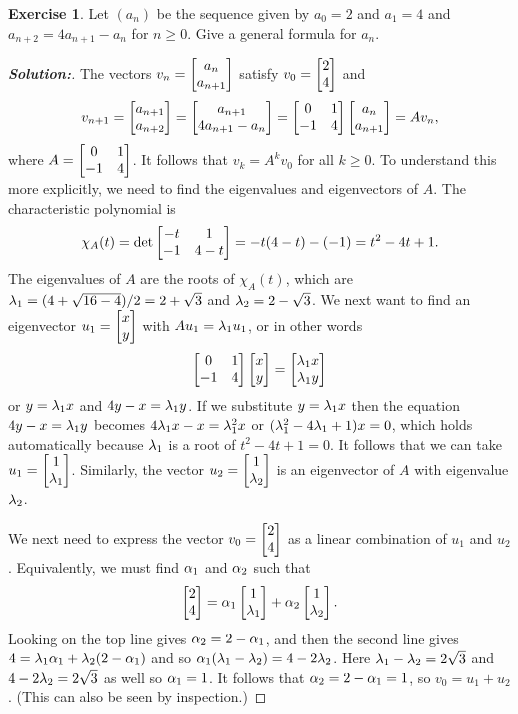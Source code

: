 \documentclass[a4paper]{amsart}
\theoremstyle{definition}
\newtheorem{exercise}{Exercise}
\newenvironment{solution}{\begin{proof}[\textbf{Solution:}] \vphantom{u}}{\end{proof}}
\begin{document}
\begin{exercise}\label{ex-diffeq-iii}
 Let $(a_n)$ be the sequence given by $a_0=2$ and $a_1=4$ and
 $a_{n+2}=4a_{n+1}-a_n$ for $n\geq 0$.  Give a general formula for
 $a_n$. 
\end{exercise}
\begin{solution}
 The vectors $v_n=\left[\begin{matrix} a_n\\a_{n+1}\end{matrix}\right]$ satisfy $v_0=\left[\begin{matrix} 2\\4\end{matrix}\right]$
 and 
 \[ v_{n+1}
     = \left[\begin{matrix} a_{n+1}\\a_{n+2}\end{matrix}\right]
     = \left[\begin{matrix} a_{n+1}\\4a_{n+1}-a_n\end{matrix}\right] 
     = \left[\begin{matrix} 0&1 \\ -1&4\end{matrix}\right] \left[\begin{matrix} a_n\\ a_{n+1}\end{matrix}\right] 
     = A v_n,
 \]
 where $A=\left[\begin{matrix} 0&1\\ -1&4\end{matrix}\right]$.  It follows that $v_k=A^kv_0$ for all
 $k\geq 0$.  To understand this more explicitly, we need to find the
 eigenvalues and eigenvectors of $A$.  The characteristic polynomial
 is 
 \[ \chi_A(t) = \det\left[\begin{matrix} -t&1\\-1&4-t \end{matrix}\right] =
     -t(4-t)-(-1) = t^2-4t+1.
 \]
 The eigenvalues of $A$ are the roots of $\chi_A(t)$, which are
 $\lambda_1=(4+\sqrt{16-4})/2=2+\sqrt{3}$ and $\lambda_2=2-\sqrt{3}$.  We next
 want to find an eigenvector $u_1=\left[\begin{matrix} x\\ y\end{matrix}\right]$ with
 $Au_1=\lambda_1u_1$, or in other words
 \[ \left[\begin{matrix} 0 & 1 \\ -1 & 4 \end{matrix}\right] \left[\begin{matrix} x \\ y \end{matrix}\right] =
     \left[\begin{matrix} \lambda_1 x\\ \lambda_1 y\end{matrix}\right]
 \]
 or $y=\lambda_1x$ and $4y-x=\lambda_1y$.  If we substitute $y=\lambda_1x$ then
 the equation $4y-x=\lambda_1y$ becomes $4\lambda_1x-x=\lambda_1^2x$ or
 $(\lambda_1^2-4\lambda_1+1)x=0$, which holds automatically because $\lambda_1$ is
 a root of $t^2-4t+1=0$.  It follows that we can take
 $u_1=\left[\begin{matrix} 1\\\lambda_1\end{matrix}\right]$.  Similarly, the vector
 $u_2=\left[\begin{matrix} 1\\\lambda_2\end{matrix}\right]$ is an eigenvector of $A$ with eigenvalue
 $\lambda_2$.  

 We next need to express the vector $v_0=\left[\begin{matrix} 2\\4\end{matrix}\right]$ as a linear
 combination of $u_1$ and $u_2$.  Equivalently, we must find $\alpha_1$
 and $\alpha_2$ such that 
 \[ \left[\begin{matrix} 2\\ 4\end{matrix}\right] = \alpha_1 \left[\begin{matrix} 1\\\lambda_1\end{matrix}\right] + \alpha_2\left[\begin{matrix} 1\\\lambda_2\end{matrix}\right].
 \]
 Looking on the top line gives $\alpha_2=2-\alpha_1$, and then the second
 line gives $4=\lambda_1\alpha_1+\lambda_2(2-\alpha_1)$ and so
 $\alpha_1(\lambda_1-\lambda_2)=4-2\lambda_2$.  Here $\lambda_1-\lambda_2=2\sqrt{3}$ and
 $4-2\lambda_2=2\sqrt{3}$ as well so $\alpha_1=1$.  It follows that
 $\alpha_2=2-\alpha_1=1$, so $v_0=u_1+u_2$.  (This can also be seen by
 inspection.) 


\end{solution}
\end{document}
